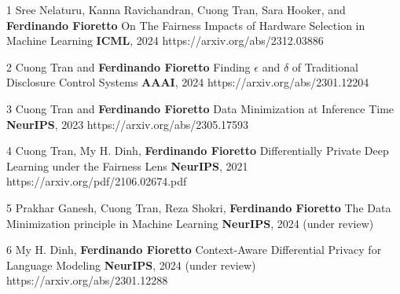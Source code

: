 \documentclass[localFont,alternative]{documentMETADATA}
\begin{document}
\begin{pubs}
	\confentryShort
  {1} %
	{Sree Nelaturu, Kanna Ravichandran, Cuong Tran, Sara Hooker, and {\bf Ferdinando Fioretto}}
	{On The Fairness Impacts of Hardware Selection in Machine Learning}
  {\textbf{ICML}, 2024}
	{https://arxiv.org/abs/2312.03886}

	\confentryShort
	{2}
	{{Cuong Tran} and {\bf Ferdinando Fioretto}}
	{Finding $\epsilon$ and $\delta$ of Traditional Disclosure Control Systems}
	{\textbf{AAAI}, 2024}
	{https://arxiv.org/abs/2301.12204}

	\confentryShort
	{3}
	{{Cuong Tran} and {\bf Ferdinando Fioretto}}
	{Data Minimization at Inference Time}
	{\textbf{NeurIPS}, 2023}
	{https://arxiv.org/abs/2305.17593}


	\confentryShort
	{4} %
	{{Cuong Tran}, {My H. Dinh}, {\bf Ferdinando Fioretto}}
	{Differentially Private Deep Learning under the Fairness Lens}
	{\textbf{NeurIPS}, 2021}
	{https://arxiv.org/pdf/2106.02674.pdf}

	\confentryShort
	{5}
	{Prakhar Ganesh, {Cuong Tran}, Reza Shokri, {\bf Ferdinando Fioretto}}
	{The Data Minimization principle in Machine Learning}
	{\textbf{NeurIPS}, 2024 (under review)}
	{}

	\confentryShort
	{6}%
	{{My H. Dinh}, {\bf Ferdinando Fioretto}}
	{Context-Aware Differential Privacy for Language Modeling}
	{\textbf{NeurIPS}, 2024 (under review)}
	{https://arxiv.org/abs/2301.12288}

\end{pubs}

\vspace{-2pt}
\vspace{-6pt}
\end{document}
